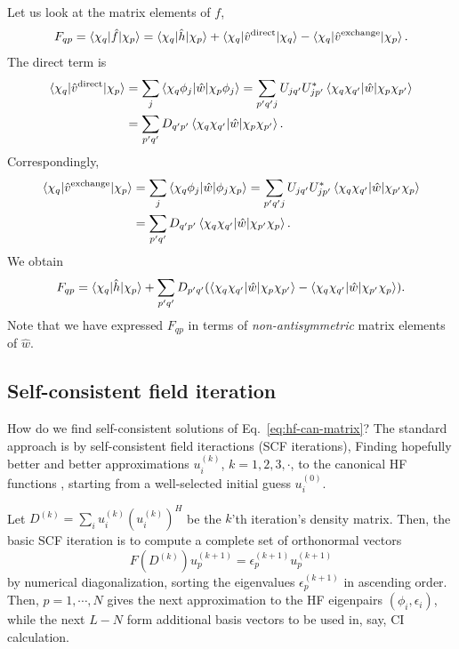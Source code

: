 \documentclass{report}
\theoremstyle{plain}
\theoremstyle{definition}
\begin{document}
Let us look at the matrix elements of ${f}$,
\begin{equation}
  {F}_{qp} = \braket{\chi_q|\hat{f}|\chi_p} =
  \braket{\chi_q|\hat{h}|\chi_p} +
  \braket{\chi_q|\hat{v}^\text{direct}|\chi_q} -
  \braket{\chi_q|\hat{v}^\text{exchange}|\chi_p}.
\end{equation}
The direct term is
\begin{equation}
  \begin{split}
  \braket{\chi_q|\hat{v}^\text{direct}|\chi_p} &=\sum_j
  \braket{\chi_q\phi_j|\hat{w}|\chi_p\phi_j} = \sum_{p'q' j} U_{jq'}
  U_{jp'}^*  \braket{\chi_q\chi_{q'}|\hat{w}|\chi_p \chi_{p'}} \\
  & = \sum_{p'q'} D_{q'p'} \braket{\chi_q \chi_{q'}|\hat{w}|\chi_{p} \chi_{p'}}.
\end{split}
\end{equation}
Correspondingly,
\begin{equation}
  \begin{split}
  \braket{\chi_q|\hat{v}^\text{exchange}|\chi_p} &=\sum_j
  \braket{\chi_q\phi_j|\hat{w}|\phi_j\chi_p} = \sum_{p'q' j} U_{jq'}
  U_{jp'}^*  \braket{\chi_q\chi_{q'}|\hat{w}|\chi_{p'}\chi_p} \\
  & = \sum_{p'q'} D_{q'p'} \braket{\chi_q \chi_{q'}|\hat{w}|\chi_{p'} \chi_{p}}.
\end{split}
\end{equation}
We obtain
\begin{equation}
  F_{qp} = \braket{\chi_q|\hat{h}|\chi_p} + \sum_{p'q'} D_{p'q'} (\braket{\chi_q \chi_{q'}|\hat{w}|\chi_{p} \chi_{p'}}
  - \braket{\chi_q \chi_{q'}|\hat{w}|\chi_{p'} \chi_{p}}).
\end{equation}
Note that we have expressed $F_{qp}$ in terms of
\emph{non-antisymmetric} matrix elements of $\hat{w}$.

\subsection{Self-consistent field iteration}

How do we find self-consistent solutions of
Eq.~\eqref{eq:hf-can-matrix}? The standard approach is by
self-consistent field iteractions (SCF iterations), Finding hopefully
better and better approximations $u_i^{(k)}$, $k=1,2,3,\cdot$, to the
canonical HF functions , starting from a well-selected initial guess
$u_i^{(0)}$.

Let $D^{(k)} = \sum_i u_i^{(k)} (u_i^{(k)})^H$ be the $k$'th
iteration's density matrix. Then, the basic SCF iteration is to
compute a complete set of orthonormal vectors
\begin{equation}
  F(D^{(k)}) u^{(k+1)}_p = \epsilon_p^{(k+1)} u_p^{(k+1)}
\end{equation}
by numerical diagonalization, sorting the eigenvalues
$\epsilon_{p}^{(k+1)}$ in ascending order. Then, $p=1,\cdots,N$ gives the next
approximation to the HF eigenpairs $(\phi_i,\epsilon_i)$, while the
next $L-N$ form additional basis vectors to be used in, say, CI calculation.
\end{document}
